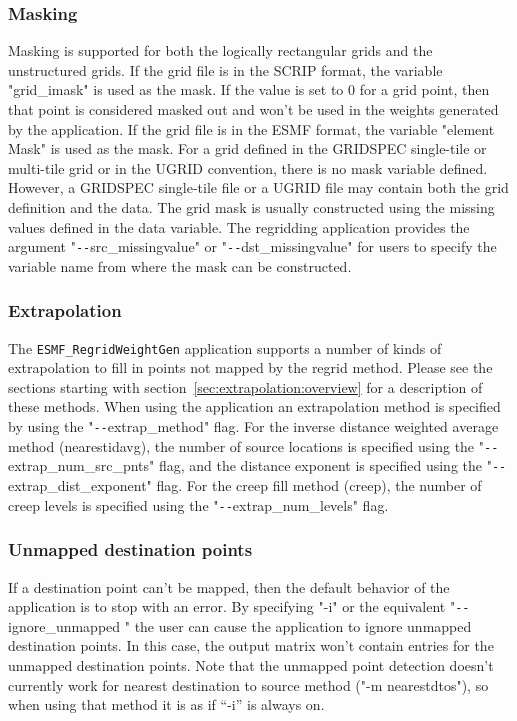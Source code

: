 \subsubsection{Masking}\label{sec:rwg_masking}
       Masking is supported for both the logically rectangular grids and the unstructured grids.
If the grid file is in the SCRIP format, the variable "grid\_imask" is used as the mask.
If the value is set to 0 for a grid point, then that point is considered masked out and
won't be used in the weights generated by the application. If the grid file is in the ESMF format, the variable "element Mask" is used as the mask.  For a grid defined in the GRIDSPEC
single-tile or multi-tile grid or in the UGRID convention, there is no mask variable defined.
However, a GRIDSPEC single-tile file or a UGRID file may contain both the grid definition and the data.
The grid mask is usually constructed using the missing values defined in the data variable.
The regridding application provides the argument "\verb+--+src\_missingvalue" or
"\verb+--+dst\_missingvalue" for users to specify the variable name from where the mask can be
constructed.

\subsubsection{Extrapolation}\label{sec:rwg_extrap}
The {\tt ESMF\_RegridWeightGen} application supports a number of kinds of extrapolation to fill in points not mapped by the regrid method. 
Please see the sections starting with section~\ref{sec:extrapolation:overview} for a description of these methods. When using the application
an extrapolation method is specified by using the "\verb+--+extrap\_method" flag. For the inverse distance weighted average method (nearestidavg),
the number of source locations is specified using the "\verb+--+extrap\_num\_src\_pnts" flag, and the distance exponent is specified using 
the "\verb+--+extrap\_dist\_exponent" flag. For the creep fill method (creep), the number of creep levels is specified using the "\verb+--+extrap\_num\_levels" flag.

\subsubsection{Unmapped destination points}\label{sec:rwg_unmapped}
If a destination point can't be mapped, then the default behavior of the application is to stop with an error. By specifying "-i" or the equivalent "\verb+--+ignore\_unmapped " the user can cause the application to ignore unmapped destination points. In this case, the output matrix won't contain entries for the unmapped destination points. Note that the unmapped point detection doesn't
currently work for nearest destination to source method ("-m nearestdtos"), so when using that method it  is as if ``-i'' is always on.

